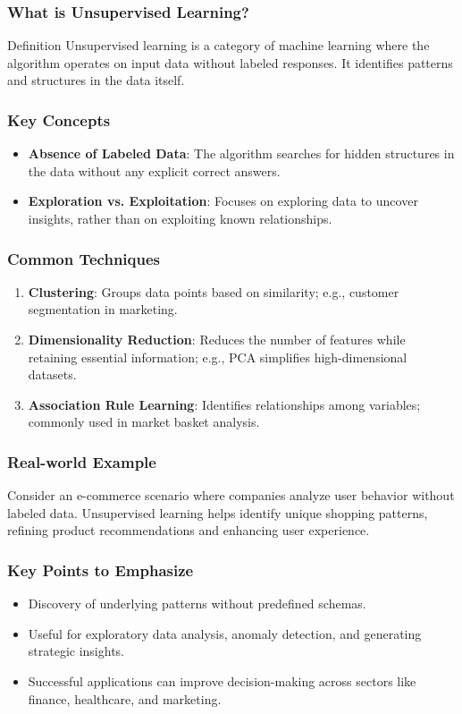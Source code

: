 \documentclass[aspectratio=169]{beamer}
\begin{document}
\begin{frame}[fragile]
    \frametitle{What is Unsupervised Learning?}
    \begin{block}{Definition}
        Unsupervised learning is a category of machine learning where the algorithm operates on input data without labeled responses. It identifies patterns and structures in the data itself.
    \end{block}
\end{frame}

\begin{frame}[fragile]
    \frametitle{Key Concepts}
    \begin{itemize}
        \item \textbf{Absence of Labeled Data}: The algorithm searches for hidden structures in the data without any explicit correct answers.
        \item \textbf{Exploration vs. Exploitation}: Focuses on exploring data to uncover insights, rather than on exploiting known relationships.
    \end{itemize}
\end{frame}

\begin{frame}[fragile]
    \frametitle{Common Techniques}
    \begin{enumerate}
        \item \textbf{Clustering}: Groups data points based on similarity; e.g., customer segmentation in marketing.
        \item \textbf{Dimensionality Reduction}: Reduces the number of features while retaining essential information; e.g., PCA simplifies high-dimensional datasets.
        \item \textbf{Association Rule Learning}: Identifies relationships among variables; commonly used in market basket analysis.
    \end{enumerate}
\end{frame}

\begin{frame}[fragile]
    \frametitle{Real-world Example}
    Consider an e-commerce scenario where companies analyze user behavior without labeled data. Unsupervised learning helps identify unique shopping patterns, refining product recommendations and enhancing user experience.
\end{frame}

\begin{frame}[fragile]
    \frametitle{Key Points to Emphasize}
    \begin{itemize}
        \item Discovery of underlying patterns without predefined schemas.
        \item Useful for exploratory data analysis, anomaly detection, and generating strategic insights.
        \item Successful applications can improve decision-making across sectors like finance, healthcare, and marketing.
    \end{itemize}
\end{frame}
\end{document}
